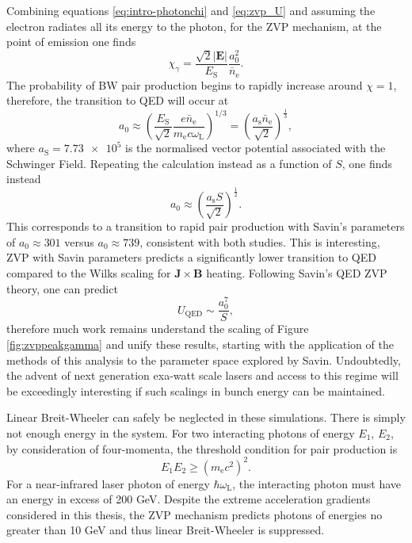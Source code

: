 Combining equations \ref{eq:intro-photonchi} and \ref{eq:zvp_U} and assuming the electron radiates all its energy to the photon, for the ZVP mechanism, at the point of emission one finds
\begin{equation}
	\chi_\gamma =\frac{ \sqrt{2} |\mathbf{E}|}{E_\mathrm{S}}\frac{a^2_0}{\bar{n}_\mathrm{e}}.
\end{equation}
The probability of \ac{BW} pair production begins to rapidly increase around $\chi =1$, therefore, the transition to QED will occur at
\begin{equation}
	a_0 \approx \left(\frac{ E_\mathrm{S}}{\sqrt{2}}\frac{e\bar{n}_\mathrm{e}}{m_\mathrm{e}c\omega_\mathrm{L}}\right)^{1/3} = \left(\frac{a_\mathrm{s}\bar{n}_\mathrm{e}}{\sqrt{2}}\right)^{\frac{1}{3}},
\end{equation}
where $a_\mathrm{S} = \num{7.73e5}$ is the normalised vector potential associated with the Schwinger Field. Repeating the calculation instead as a function of $S$, one finds instead
\begin{equation}
		a_0 \approx \left(\frac{a_\mathrm{s}S}{\sqrt{2}}\right)^{\frac{1}{2}}.
\end{equation}
This corresponds to a transition to rapid pair production with Savin's parameters of $a_0 \approx 301$ versus $a_0 \approx 739$, consistent with both studies. This is interesting, ZVP with Savin parameters predicts a significantly lower transition to QED compared to the Wilks scaling for $\mathbf{J}\times\mathbf{B}$ heating. Following Savin's QED ZVP theory, one can predict
\begin{equation}
	U_\mathrm{QED} \sim \frac{a^7_0}{S},
\end{equation}
therefore much work remains understand the scaling of Figure \ref{fig:zvppeakgamma} and unify these results, starting with the application of the methods of this analysis to the parameter space explored by Savin. Undoubtedly, the advent of next generation exa-watt scale lasers and access to this regime will be exceedingly interesting if such scalings in bunch energy can be maintained.

Linear Breit-Wheeler can safely be neglected in these simulations. There is simply not enough energy in the system. For two interacting photons of energy $E_1$, $E_2$, by consideration of four-momenta, the threshold condition for pair production is 
\begin{equation}
	E_1E_2 \ge (m_\mathrm{e}c^2)^2.
\end{equation}
For a near-infrared laser photon of energy $\hbar \omega_\mathrm{L}$, the interacting photon must have an energy in excess of 200 GeV. Despite the extreme acceleration gradients considered in this thesis, the ZVP mechanism predicts photons of energies no greater than 10 GeV and thus linear Breit-Wheeler is suppressed.

